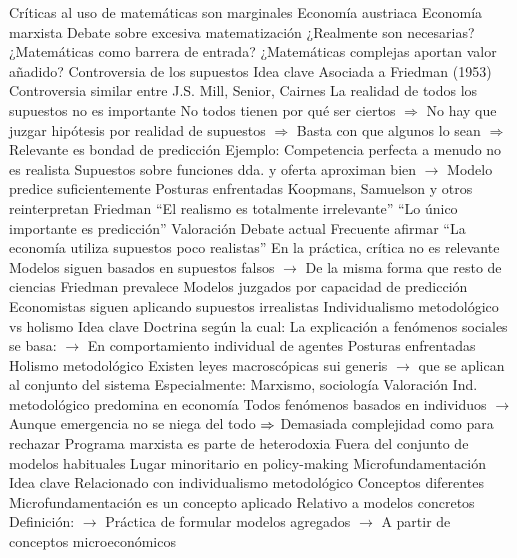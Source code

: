 \documentclass{nuevotema}
\begin{document}
\begin{esquemal}
				\4 Críticas al uso de matemáticas son marginales
				\4[] Economía austriaca
				\4[] Economía marxista
				\4 Debate sobre excesiva matematización
				\4[] ¿Realmente son necesarias?
				\4[] ¿Matemáticas como barrera de entrada?
				\4[] ¿Matemáticas complejas aportan valor añadido?
		\2 Controversia de los supuestos
			\3 Idea clave
				\4 Asociada a Friedman (1953)
				\4[] Controversia similar entre J.S. Mill, Senior, Cairnes
				\4 La realidad de todos los supuestos no es importante
				\4[] No todos tienen por qué ser ciertos
				\4[] $\Rightarrow$ No hay que juzgar hipótesis por realidad de supuestos
				\4[] $\Rightarrow$ Basta con que algunos lo sean
				\4[] $\Rightarrow$ Relevante es bondad de predicción
				\4 Ejemplo:
				\4[] Competencia perfecta a menudo no es realista
				\4[] Supuestos sobre funciones dda. y oferta aproximan bien
				\4[] $\to$ Modelo predice suficientemente
			\3 Posturas enfrentadas
				\4 Koopmans, Samuelson y otros reinterpretan Friedman
				\4[] ``El realismo es totalmente irrelevante''
				\4[] ``Lo único importante es predicción''
			\3 Valoración
				\4 Debate actual
				\4 Frecuente afirmar
				\4[] ``La economía utiliza supuestos poco realistas''
				\4 En la práctica, crítica no es relevante
				\4[] Modelos siguen basados en supuestos falsos
				\4[] $\to$ De la misma forma que resto de ciencias
				\4 Friedman prevalece
				\4[] Modelos juzgados por capacidad de predicción
				\4[] Economistas siguen aplicando supuestos irrealistas
		\2 Individualismo metodológico vs holismo
			\3 Idea clave
				\4 Doctrina según la cual:
				\4[] La explicación a fenómenos sociales se basa:
				\4[] $\to$ En comportamiento individual de agentes
			\3 Posturas enfrentadas
				\4 Holismo metodológico
				\4[] Existen leyes macroscópicas sui generis
				\4[] $\to$ que se aplican al conjunto del sistema
				\4 Especialmente:
				\4[] Marxismo, sociología
			\3 Valoración
				\4 Ind. metodológico predomina en economía
				\4[] Todos fenómenos basados en individuos
				\4[] $\to$ Aunque emergencia no se niega del todo
				\4[] $\Rightarrow$ Demasiada complejidad como para rechazar
				\4 Programa marxista es parte de heterodoxia
				\4[] Fuera del conjunto de modelos habituales
				\4[] Lugar minoritario en policy-making
		\2 Microfundamentación
			\3 Idea clave
				\4 Relacionado con individualismo metodológico
				\4[] Conceptos diferentes
				\4 Microfundamentación es un concepto aplicado
				\4[] Relativo a modelos concretos
				\4[] Definición:
				\4[] $\to$ Práctica de formular modelos agregados
				\4[] $\to$ A partir de conceptos microeconómicos

\end{esquemal}
\end{document}
